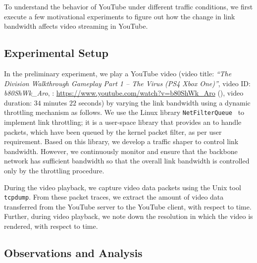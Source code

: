 
To understand the behavior of YouTube under different traffic conditions, we first execute a few motivational experiments to figure out how the change in link bandwidth affects video streaming in YouTube. 

\subsection{Experimental Setup}
In the preliminary experiment, we play a YouTube video (video title: {\em ``The Division Walkthrough Gameplay Part 1 -- The Virus (PS4 Xbox One)''}, video ID: {\em b80ShWk\_Aro}, : \url{https://www.youtube.com/watch?v=b80ShWk_Aro} (\lastaccessedtoday), video duration: $34$ minutes $22$ seconds) by varying the link bandwidth using a dynamic throttling mechanism as follows. We use the Linux library \texttt{NetFilterQueue}~\cite{nfqueue} to implement link throttling; it is a user-space library that provides an  to handle packets, which have been queued by the kernel packet filter, as per user requirement. Based on this library, we develop a traffic shaper to control link bandwidth. However, we continuously monitor and ensure that the backbone network has sufficient bandwidth so that the overall link bandwidth is controlled only by the throttling procedure. 

During the video playback, we capture video data packets using the Unix tool \texttt{tcpdump}. From these packet traces, we extract the amount of video data transferred from the YouTube server to the YouTube client, with respect to time. Further, during video playback, we note down the resolution in which the video is rendered, with respect to time. 

\subsection{Observations and Analysis}

